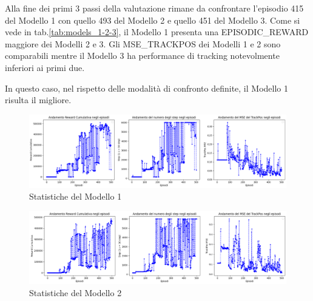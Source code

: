 Alla fine dei primi 3 passi della valutazione rimane da confrontare l'episodio 415 del Modello 1 con quello 493 del Modello 2 e quello 451 del Modello 3. Come si vede in tab.\ref{tab:models_1-2-3}, il Modello 1 presenta una EPISODIC\_REWARD maggiore dei Modelli 2 e 3.
\newline
Gli MSE\_TRACKPOS dei Modelli 1 e 2 sono comparabili mentre il Modello 3 ha performance di tracking notevolmente inferiori ai primi due.
\newline

In questo caso, nel rispetto delle modalità di confronto definite, il Modello 1 risulta il migliore.

\begin{table}[hb]
\centering
{}
\caption{Confronto Modelli 1, 2 e 3}
\label{tab:models_1-2-3}
\end{table}

\begin{figure}[hb]
    \centering
    \includegraphics[width = 6in]{Figures/Chapter5/model_1.png}
    \caption{Statistiche del Modello 1}
    \label{fig:model_1}
\end{figure}

\begin{figure}[hb]
    \centering
    \includegraphics[width = 6in]{Figures/Chapter5/model_2.png}
    \caption{Statistiche del Modello 2}
    \label{fig:model_2}
\end{figure}

